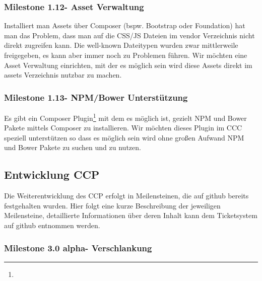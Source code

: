 \documentclass[
paper=a4,
draft=false,%
fontsize=10pt%
]{scrartcl}
\begin{document}
\subsubsection[Milestone 1.12 - Asset Verwaltung]{Milestone 1.12\footnotemark - Asset Verwaltung}
\label{subsec:ccc-milestone-1.12}

Installiert man Assets über Composer (bspw. Bootstrap oder Foundation) hat man das Problem, dass man auf die CSS/JS Dateien im vendor Verzeichnis nicht direkt zugreifen kann. Die well-known Dateitypen wurden zwar mittlerweile freigegeben, es kann aber immer noch zu Problemen führen. Wir möchten eine Asset Verwaltung einrichten, mit der es möglich sein wird diese Assets direkt im assets Verzeichnis nutzbar zu machen.

\subsubsection[Milestone 1.13 - NPM/Bower Unterstützung]{Milestone 1.13\footnotemark - NPM/Bower Unterstützung}
\label{subsec:ccc-milestone-1.13}

Es gibt ein Composer Plugin\footnote{} mit dem es möglich ist, gezielt NPM und Bower Pakete mittels Composer zu installieren. Wir möchten dieses Plugin im CCC speziell unterstützen so dass es möglich sein wird ohne großen Aufwand NPM und Bower Pakete zu suchen und zu nutzen.

\pagebreak

\subsection{Entwicklung CCP}
\label{subsec:ccp}

Die Weiterentwicklung des CCP erfolgt in Meilensteinen, die auf github bereits festgehalten wurden. Hier folgt eine kurze Beschreibung der jeweiligen Meilensteine, detaillierte Informationen über deren Inhalt kann dem Ticketsystem auf github entnommen werden.

\subsubsection[Milestone 3.0 alpha - Verschlankung]{Milestone 3.0 alpha\footnotemark - Verschlankung}
\label{subsec:ccp-milestone-3.0-alpha}
\end{document}
